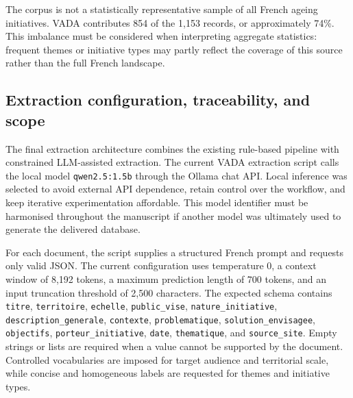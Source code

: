 The corpus is not a statistically representative sample of all French ageing
initiatives. VADA contributes 854 of the 1,153 records, or approximately
74\%. This imbalance must be considered when interpreting aggregate statistics:
frequent themes or initiative types may partly reflect the coverage of this
source rather than the full French landscape.

\subsection{Extraction configuration, traceability, and scope}

The final extraction architecture combines the existing rule-based pipeline with
constrained LLM-assisted extraction. The current VADA extraction script calls
the local model \texttt{qwen2.5:1.5b} through the Ollama chat API. Local
inference was selected to avoid external API dependence, retain control over the
workflow, and keep iterative experimentation affordable. This model identifier
must be harmonised throughout the manuscript if another model was ultimately
used to generate the delivered database.

For each document, the script supplies a structured French prompt and requests
only valid JSON. The current configuration uses temperature 0, a context window
of 8,192 tokens, a maximum prediction length of 700 tokens, and an input
truncation threshold of 2,500 characters. The expected schema contains
\texttt{titre}, \texttt{territoire}, \texttt{echelle}, \texttt{public\_vise},
\texttt{nature\_initiative}, \texttt{description\_generale},
\texttt{contexte}, \texttt{problematique}, \texttt{solution\_envisagee},
\texttt{objectifs}, \texttt{porteur\_initiative}, \texttt{date},
\texttt{thematique}, and \texttt{source\_site}. Empty strings or lists are
required when a value cannot be supported by the document. Controlled
vocabularies are imposed for target audience and territorial scale, while concise
and homogeneous labels are requested for themes and initiative types.

